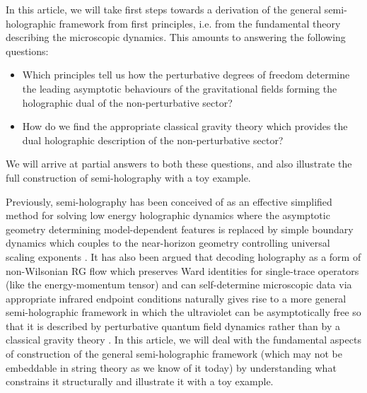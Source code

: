 \documentclass[prd,reprint,a4paper,showpacs,superscriptaddress,11pt,onecolumn,nofootinbib]{revtex4-1}
\renewcommand{\(}{\left(}
\renewcommand{\)}{\right)}
\newcommand{\6}{\partial}
\begin{document}
In this article, we will take first steps towards a derivation of the general semi-holographic framework from first principles, i.e. from the fundamental theory describing the microscopic dynamics. This amounts to answering the following questions:
\begin{itemize}
\item Which principles tell us how the perturbative degrees of freedom determine the leading asymptotic behaviours of the gravitational fields forming the holographic dual of the non-perturbative sector?
\item How do we find the appropriate classical gravity theory which provides the dual holographic description of the non-perturbative sector? 
\end{itemize}
We will arrive at partial answers to both these questions, and also illustrate the full construction of semi-holography with a toy example.

Previously, semi-holography has been conceived of as an effective simplified method for solving low energy holographic dynamics where the asymptotic geometry determining model-dependent features is replaced by simple boundary dynamics which couples to the near-horizon geometry controlling universal scaling exponents \cite{Faulkner:2010tq,Faulkner:2010jy}. It has also been argued that decoding holography as a form of non-Wilsonian RG flow which preserves Ward identities for single-trace operators (like the energy-momentum tensor) and can self-determine microscopic data via appropriate infrared endpoint conditions naturally gives rise to a more general semi-holographic framework in which the ultraviolet can be asymptotically free so that it is described by perturbative quantum field dynamics rather than by a classical gravity theory \cite{Behr:2015yna,Behr:2015aat,Mukhopadhyay:2016fre}. In this article, we will deal with the fundamental aspects of construction of the general semi-holographic framework (which may not be embeddable in string theory as we know of it today)  by understanding what constrains it structurally and illustrate it with a toy example.
\end{document}

